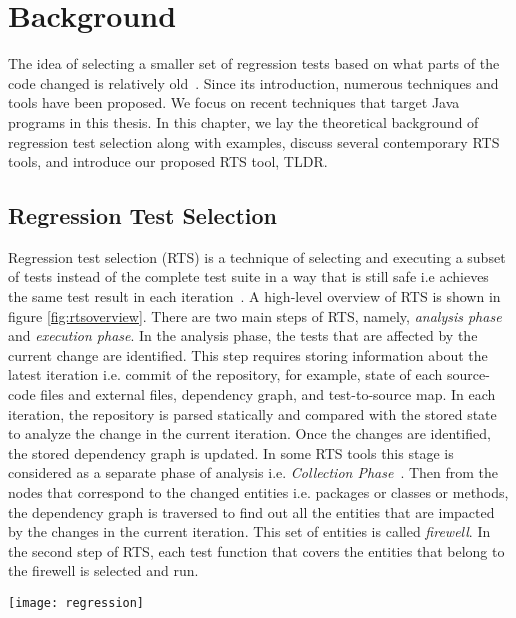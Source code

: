 \chapter{Background}
\label{sec:background}

The idea of selecting a smaller set of regression tests based on what parts of the code changed is relatively old~\cite{leung1989insights}. Since its introduction, numerous techniques and tools have been proposed. We focus on recent techniques that target Java programs in this thesis. In this chapter, we lay the theoretical background of regression test selection along with examples, discuss several contemporary RTS tools, and introduce our proposed RTS tool, TLDR. 

\section{Regression Test Selection}

Regression test selection (RTS) is a technique of selecting and executing a subset of tests instead of the complete test suite in a way that is still safe i.e achieves the same test result in each iteration~\cite{engstrom2010systematic, gligoric2014regression, gligoric2015regression}. A high-level overview of RTS is shown in figure \ref{fig:rtsoverview}. There are two main steps of RTS, namely, \textit{analysis phase} and \textit{execution phase}. In the analysis phase, the tests that are affected by the current change are identified. This step requires storing information about the latest iteration i.e. commit of the repository, for example, state of each source-code files and external files, dependency graph, and test-to-source map. In each iteration, the repository is parsed statically and compared with the stored state to analyze the change in the current iteration. Once the changes are identified, the stored dependency graph is updated. In some RTS tools this stage is considered as a separate phase of analysis i.e. \textit{Collection Phase}~\cite{gligoric2015regression}. Then from the nodes that correspond to the changed entities i.e. packages or classes or methods, the dependency graph is traversed to find out all the entities that are impacted by the changes in the current iteration. This set of entities is called \textit{firewell}. In the second step of RTS, each test function that covers the entities that belong to the firewell is selected and run.   

\begin{figure*}
\begin{center}
  \texttt{[image: regression]}
  \caption{High-level overview of Regression Test Selection}
  \label{fig:rtsoverview}
\end{center}
\end{figure*}


